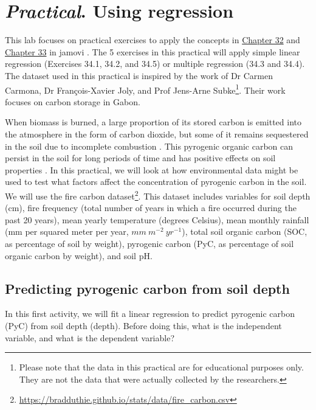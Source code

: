 \documentclass[
  openany]{scrbook}
\begin{document}
\hypertarget{Chapter_34}{%
\chapter{\texorpdfstring{\emph{Practical}. Using regression}{Practical. Using regression}}\label{Chapter_34}}

This lab focuses on practical exercises to apply the concepts in \protect\hyperlink{Chapter_32}{Chapter 32} and \protect\hyperlink{Chapter_33}{Chapter 33} in jamovi \citep{Jamovi2022}.
The 5 exercises in this practical will apply simple linear regression (Exercises 34.1, 34.2, and 34.5) or multiple regression (34.3 and 34.4).
The dataset used in this practical is inspired by the work of Dr Carmen Carmona, Dr François-Xavier Joly, and Prof Jens-Arne Subke\footnote{Please note that the data in this practical are for educational purposes only. They are not the data that were actually collected by the researchers.}.
Their work focuses on carbon storage in Gabon.

When biomass is burned, a large proportion of its stored carbon is emitted into the atmosphere in the form of carbon dioxide, but some of it remains sequestered in the soil due to incomplete combustion \citep{Santin2016}.
This pyrogenic organic carbon can persist in the soil for long periods of time and has positive effects on soil properties \citep{Reisser2016}.
In this practical, we will look at how environmental data might be used to test what factors affect the concentration of pyrogenic carbon in the soil.
We will use the fire carbon dataset\footnote{\url{https://bradduthie.github.io/stats/data/fire_carbon.csv}}.
This dataset includes variables for soil depth (cm), fire frequency (total number of years in which a fire occurred during the past 20 years), mean yearly temperature (degrees Celsius), mean monthly rainfall (mm per squared meter per year, \(mm\:m^{-2}\:yr^{-1}\)), total soil organic carbon (SOC, as percentage of soil by weight), pyrogenic carbon (PyC, as percentage of soil organic carbon by weight), and soil pH.

\hypertarget{predicting-pyrogenic-carbon-from-soil-depth}{%
\section{Predicting pyrogenic carbon from soil depth}\label{predicting-pyrogenic-carbon-from-soil-depth}}

In this first activity, we will fit a linear regression to predict pyrogenic carbon (PyC) from soil depth (depth).
Before doing this, what is the independent variable, and what is the dependent variable?
\end{document}
